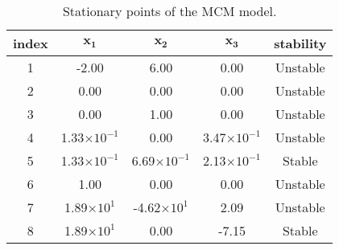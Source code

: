 \begin{table}[H]
	\begin{center}
		\begin{tabular}{|c|c|c|c|c|}
			\hline
			\textbf{index} & $\mathbf{x_1}$ & $\mathbf{x_2}$ & $\mathbf{x_3}$ & \textbf{stability} \\
			\hline
			1 & -2.00 & 6.00 & 0.00 & Unstable \\
			2 & 0.00 & 0.00 & 0.00 & Unstable \\
			3 & 0.00 & 1.00 & 0.00 & Unstable \\
			4 & 1.33$\times 10^{-1}$ & 0.00 & 3.47$\times 10^{-1}$ & Unstable \\
			5 & 1.33$\times 10^{-1}$ & 6.69$\times 10^{-1}$ & 2.13$\times 10^{-1}$ & Stable \\
			6 & 1.00 & 0.00 & 0.00 & Unstable \\
			7 & 1.89$\times 10^{1}$ & -4.62$\times 10^{1}$ & 2.09 & Unstable \\
			8 & 1.89$\times 10^{1}$ & 0.00 & -7.15 & Stable \\
			\hline
		\end{tabular}
	\end{center}
	\caption{Stationary points of the MCM model.}
	\label{tab:mcm_stationary_points}
\end{table}